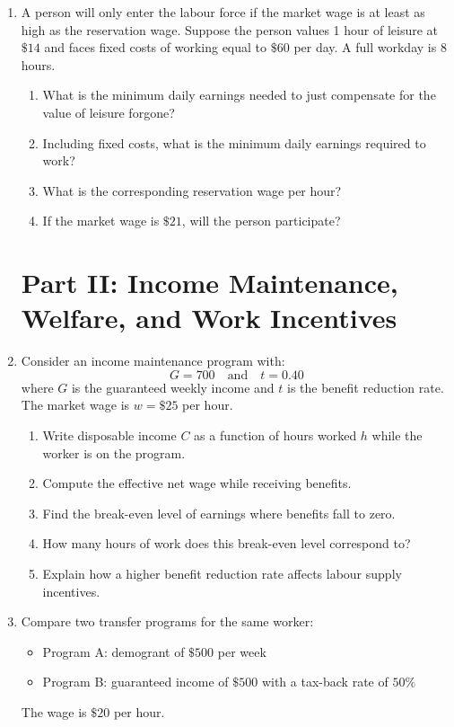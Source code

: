 \documentclass[12pt]{article}
\begin{document}
\begin{enumerate}
\item A person will only enter the labour force if the market wage is at least as high as the reservation wage. Suppose the person values 1 hour of leisure at \(\$14\) and faces fixed costs of working equal to \(\$60\) per day. A full workday is 8 hours.

\begin{enumerate}[label=(\alph*)]
    \item What is the minimum daily earnings needed to just compensate for the value of leisure forgone?
    \item Including fixed costs, what is the minimum daily earnings required to work?
    \item What is the corresponding reservation wage per hour?
    \item If the market wage is \(\$21\), will the person participate?
\end{enumerate}

\section*{Part II: Income Maintenance, Welfare, and Work Incentives}

\item Consider an income maintenance program with:
\[
G = 700 \quad \text{and} \quad t = 0.40
\]
where \(G\) is the guaranteed weekly income and \(t\) is the benefit reduction rate. The market wage is \(w=\$25\) per hour.

\begin{enumerate}[label=(\alph*)]
    \item Write disposable income \(C\) as a function of hours worked \(h\) while the worker is on the program.
    \item Compute the effective net wage while receiving benefits.
    \item Find the break-even level of earnings where benefits fall to zero.
    \item How many hours of work does this break-even level correspond to?
    \item Explain how a higher benefit reduction rate affects labour supply incentives.
\end{enumerate}

\item Compare two transfer programs for the same worker:
\begin{itemize}
    \item Program A: demogrant of \(\$500\) per week
    \item Program B: guaranteed income of \(\$500\) with a tax-back rate of \(50\%\)
\end{itemize}
The wage is \(\$20\) per hour.


\end{enumerate}
\end{document}

